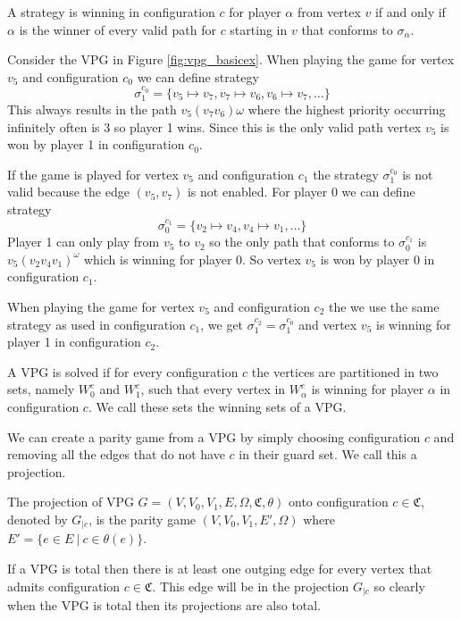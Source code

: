 A strategy is winning in configuration $c$ for player $\alpha$ from vertex $v$ if and only if $\alpha$ is the winner of every valid path for $c$ starting in $v$ that conforms to $\sigma_\alpha$.

\begin{example}
	Consider the VPG in Figure \ref{fig:vpg_basicex}. When playing the game for vertex $v_5$ and configuration $c_0$ we can define strategy 
	\[ \sigma_1^{c_0} = \{ v_5 \mapsto v_7, v_7\mapsto v_6,v_6\mapsto v_7, \dots \}\]
	This always results in the path $v_5(v_7v_6)\omega$ where the highest priority occurring infinitely often is 3 so player 1 wins. Since this is the only valid path vertex $v_5$ is won by player 1 in configuration $c_0$.
	
	If the game is played for vertex $v_5$ and configuration $c_1$ the strategy $\sigma_1^{c_0}$ is not valid because the edge $(v_5,v_7)$ is not enabled. For player $0$ we can define strategy
	\[ \sigma_0^{c_1} = \{ v_2 \mapsto v_4, v_4 \mapsto v_1,\dots\}\]
	Player 1 can only play from $v_5$ to $v_2$ so the only path that conforms to $\sigma_0^{c_1}$ is $v_5(v_2v_4v_1)^\omega$ which is winning for player 0. So vertex $v_5$ is won by player 0 in configuration $c_1$.
	
	When playing the game for vertex $v_5$ and configuration $c_2$ the we use the same strategy as used in configuration $c_1$, we get $\sigma_1^{c_2} = \sigma_1^{c_0}$ and vertex $v_5$ is winning for player 1 in configuration $c_2$.
\end{example}

A VPG is solved if for every configuration $c$ the vertices are partitioned in two sets, namely $W_0^c$ and $W_1^c$, such that every vertex in $W_\alpha^c$ is winning for player $\alpha$ in configuration $c$. We call these sets the winning sets of a VPG.

We can create a parity game from a VPG by simply choosing configuration $c$ and removing all the edges that do not have $c$ in their guard set. We call this a projection.

\begin{definition}
	\label{def_vpg_proj}
	The projection of VPG $G = (V,V_0,V_1,E,\Omega, \mathfrak{C},\theta)$ onto configuration $c\in \mathfrak{C}$, denoted by $G_{|c}$, is the parity game $(V,V_0,V_1,E',\Omega)$ where $E' = \{ e \in E\ |\ c \in \theta(e)\}$.
\end{definition}
If a VPG is total then there is at least one outging edge for every vertex that admits configuration $c \in \mathfrak{C}$. This edge will be in the projection $G_{|c}$ so clearly when the VPG is total then its projections are also total.

